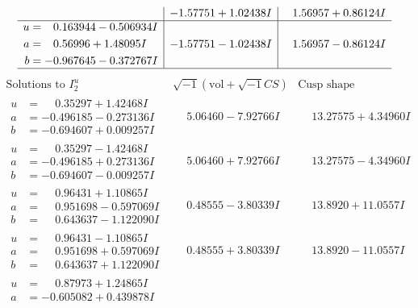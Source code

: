 \documentclass[1p]{elsarticle_modified}
\theoremstyle{definition}
\newcommand{\I}{\sqrt{-1}}
\begin{document}
$$\begin{array}{c|c|c}
 & -1.57751 + 1.02438 I & \phantom{-}1.56957 + 0.86124 I \\ \hline\begin{aligned}
u &= \phantom{-}0.163944 - 0.506934 I \\
a &= \phantom{-}0.56996 + 1.48095 I \\
b &= -0.967645 - 0.372767 I\end{aligned}
 & -1.57751 - 1.02438 I & \phantom{-}1.56957 - 0.86124 I\\
 \hline 
 \end{array}$$\newpage$$\begin{array}{c|c|c}  
\text{Solutions to }I^u_{2}& \I (\text{vol} + \sqrt{-1}CS) & \text{Cusp shape}\\
 \hline 
\begin{aligned}
u &= \phantom{-}0.35297 + 1.42468 I \\
a &= -0.496185 - 0.273136 I \\
b &= -0.694607 + 0.009257 I\end{aligned}
 & \phantom{-}5.06460 - 7.92766 I & \phantom{-}13.27575 + 4.34960 I \\ \hline\begin{aligned}
u &= \phantom{-}0.35297 - 1.42468 I \\
a &= -0.496185 + 0.273136 I \\
b &= -0.694607 - 0.009257 I\end{aligned}
 & \phantom{-}5.06460 + 7.92766 I & \phantom{-}13.27575 - 4.34960 I \\ \hline\begin{aligned}
u &= \phantom{-}0.96431 + 1.10865 I \\
a &= \phantom{-}0.951698 - 0.597069 I \\
b &= \phantom{-}0.643637 - 1.122090 I\end{aligned}
 & \phantom{-}0.48555 - 3.80339 I & \phantom{-}13.8920 + 11.0557 I \\ \hline\begin{aligned}
u &= \phantom{-}0.96431 - 1.10865 I \\
a &= \phantom{-}0.951698 + 0.597069 I \\
b &= \phantom{-}0.643637 + 1.122090 I\end{aligned}
 & \phantom{-}0.48555 + 3.80339 I & \phantom{-}13.8920 - 11.0557 I \\ \hline\begin{aligned}
u &= \phantom{-}0.87973 + 1.24865 I \\
a &= -0.605082 + 0.439878 I \\

\end{aligned}
\end{array}$$
\end{document}
